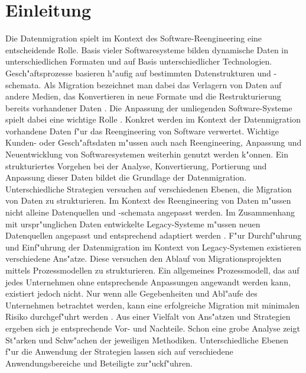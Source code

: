 \section{Einleitung}
\label{chapter:einleitung}


Die Datenmigration spielt im Kontext des Software-Reengineering eine entscheidende Rolle. Basis vieler Softwaresysteme bilden dynamische Daten in unterschiedlichen Formaten und auf Basis unterschiedlicher Technologien. Gesch"aftsprozesse basieren h"aufig auf bestimmten Datenstrukturen und -schemata. Als Migration bezeichnet man dabei das Verlagern von Daten auf andere Medien, das Konvertieren in neue Formate und die Restrukturierung bereits vorhandener Daten \citep{morris-2012}. Die Anpassung der umliegenden Software-Systeme spielt dabei eine wichtige Rolle \citep{henrard-2002}.
\lb
Konkret werden im Kontext der Datenmigration vorhandene Daten f"ur das Reengineering von Software verwertet. Wichtige Kunden- oder Gesch"aftsdaten m"ussen auch nach Reengineering, Anpassung und Neuentwicklung von Softwaresystemen weiterhin genutzt werden k"onnen. Ein strukturiertes Vorgehen bei der Analyse, Konvertierung, Portierung und Anpassung dieser Daten bildet die Grundlage der Datenmigration.  
\lb
Unterschiedliche Strategien versuchen auf verschiedenen Ebenen, die Migration von Daten zu strukturieren. Im Kontext des Reengineering von Daten m"ussen nicht alleine Datenquellen und -schemata angepasst werden. Im Zusammenhang mit urspr"unglichen Daten entwickelte Legacy-Systeme m"ussen neuen Datenquellen angepasst und entsprechend adaptiert werden \citep{henrard-2002}.	
\lb
F"ur Durchf"uhrung und Einf"uhrung der Datenmigration im Kontext von Legacy-Systemen existieren verschiedene Ans"atze. Diese versuchen den Ablauf von Migrationsprojekten mittels Prozessmodellen zu strukturieren. Ein allgemeines Prozessmodell, das auf jedes Unternehmen ohne entsprechende Anpassungen angewandt werden kann, existiert jedoch nicht. Nur wenn alle Gegebenheiten und Abl"aufe des Unternehmen betrachtet werden, kann eine erfolgreiche Migration mit minimalen Risiko durchgef"uhrt werden \citep{wuLawless-1997} \citep{ackermann-2005}.
\lb
Aus einer Vielfalt von Ans"atzen und Strategien ergeben sich je entsprechende Vor- und Nachteile. Schon eine grobe Analyse zeigt St"arken und Schw"achen der jeweiligen Methodiken. Unterschiedliche Ebenen f"ur die Anwendung der Strategien lassen sich auf verschiedene Anwendungsbereiche und Beteiligte zur"uckf"uhren.
